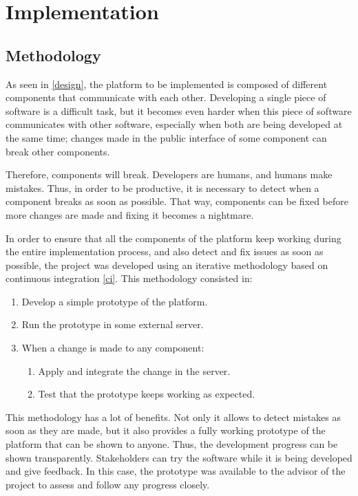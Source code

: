 \documentclass[a4paper,11pt,titlepage,abstract,numbers=noenddot,automark,mnsy,intlimits,rgb,dvipsnames]{report}
\begin{document}
\part{Implementation}
\chapter{Methodology}
\label{methodology}
As seen in \autoref{design}, the platform to be implemented is composed of different components that communicate with
each other. Developing a single piece of software is a difficult task, but it becomes even harder when this piece of software
communicates with other software, especially when both are being developed at the same time; changes made in
the public interface of some component can break other components.

Therefore, components will break. Developers are humans, and humans make mistakes. Thus, in order to be productive,
it is necessary to detect when a component breaks as soon as possible. That way, components can be fixed before more changes
are made and fixing it becomes a nightmare.

In order to ensure that all the components of the platform keep working during the entire implementation process, and also
detect and fix issues as soon as possible, the project was developed using an iterative methodology based on
continuous integration \autoref{ci}. This methodology consisted in:
\begin{enumerate}
\item
Develop a simple prototype of the platform.
\item
Run the prototype in some external server.
\item
When a change is made to any component:
\begin{enumerate}
\item
Apply and integrate the change in the server.
\item
Test that the prototype keeps working as expected.
\end{enumerate}
\end{enumerate}
This methodology has a lot of benefits. Not only it allows to detect mistakes as soon as they are made, but it also provides
a fully working prototype of the platform that can be shown to anyone. Thus, the development progress can be shown
transparently. Stakeholders can try the software while it is being developed and give feedback. In this case,
the prototype was available to the advisor of the project to assess and follow any progress closely.
\end{document}
